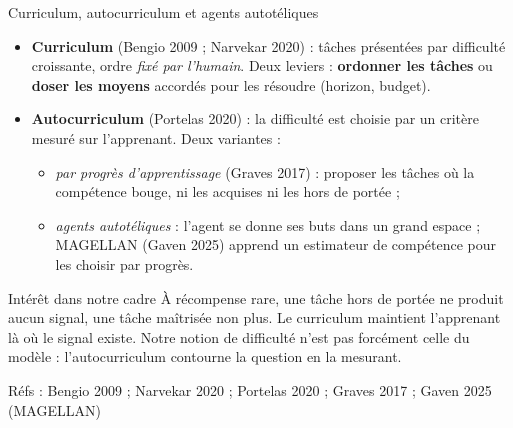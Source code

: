 \documentclass[aspectratio=169,10pt]{beamer}
\newcommand{\refs}[1]{\vfill{\tiny\textcolor{crMid}{Réfs : #1}}}
\newcommand{\hl}[1]{\textcolor{crOrange}{\textbf{#1}}}
\begin{document}
\begin{frame}{Curriculum, autocurriculum et agents autotéliques}
\footnotesize
\begin{itemize}\setlength{\itemsep}{2pt}
  \item \textbf{Curriculum} (Bengio 2009 ; Narvekar 2020) : tâches présentées par difficulté croissante, ordre \emph{fixé par l'humain}. Deux leviers : \hl{ordonner les tâches} ou \hl{doser les moyens} accordés pour les résoudre (horizon, budget).
  \item \textbf{Autocurriculum} (Portelas 2020) : la difficulté est choisie par un critère mesuré sur l'apprenant. Deux variantes :
  \begin{itemize}
    \item \emph{par progrès d'apprentissage} (Graves 2017) : proposer les tâches où la compétence bouge, ni les acquises ni les hors de portée ;
    \item \emph{agents autotéliques} : l'agent se donne ses buts dans un grand espace ; MAGELLAN (Gaven 2025) apprend un estimateur de compétence pour les choisir par progrès.
  \end{itemize}
\end{itemize}
\vspace{0.05cm}
\begin{block}{Intérêt dans notre cadre}
À récompense rare, une tâche hors de portée ne produit aucun signal, une tâche maîtrisée non plus. Le curriculum maintient l'apprenant là où le signal existe. Notre notion de difficulté n'est pas forcément celle du modèle : l'autocurriculum contourne la question en la mesurant.
\end{block}
\refs{Bengio 2009 ; Narvekar 2020 ; Portelas 2020 ; Graves 2017 ; Gaven 2025 (MAGELLAN)}
\end{frame}
\end{document}
